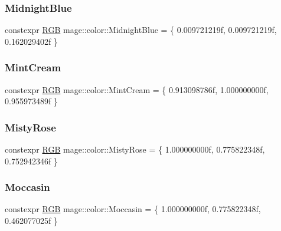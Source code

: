 \hypertarget{namespacemage_1_1color_a973485679cfd59ce6ca47a4f96104a62}{}\label{namespacemage_1_1color_a973485679cfd59ce6ca47a4f96104a62} 
\subsubsection{\texorpdfstring{Midnight\+Blue}{MidnightBlue}}
{\footnotesize\ttfamily constexpr \hyperlink{structmage_1_1_r_g_b}{R\+GB} mage\+::color\+::\+Midnight\+Blue = \{ 0.\+009721219f, 0.\+009721219f, 0.\+162029402f \}}

\hypertarget{namespacemage_1_1color_a545b07f3dbe9d887c33cd6575123d88d}{}\label{namespacemage_1_1color_a545b07f3dbe9d887c33cd6575123d88d} 
\subsubsection{\texorpdfstring{Mint\+Cream}{MintCream}}
{\footnotesize\ttfamily constexpr \hyperlink{structmage_1_1_r_g_b}{R\+GB} mage\+::color\+::\+Mint\+Cream = \{ 0.\+913098786f, 1.\+000000000f, 0.\+955973489f \}}

\hypertarget{namespacemage_1_1color_accc070278e15b17924142ac2cf2ffa7e}{}\label{namespacemage_1_1color_accc070278e15b17924142ac2cf2ffa7e} 
\subsubsection{\texorpdfstring{Misty\+Rose}{MistyRose}}
{\footnotesize\ttfamily constexpr \hyperlink{structmage_1_1_r_g_b}{R\+GB} mage\+::color\+::\+Misty\+Rose = \{ 1.\+000000000f, 0.\+775822348f, 0.\+752942346f \}}

\hypertarget{namespacemage_1_1color_ade191f43672b1ee280fbd53fed9d5558}{}\label{namespacemage_1_1color_ade191f43672b1ee280fbd53fed9d5558} 
\subsubsection{\texorpdfstring{Moccasin}{Moccasin}}
{\footnotesize\ttfamily constexpr \hyperlink{structmage_1_1_r_g_b}{R\+GB} mage\+::color\+::\+Moccasin = \{ 1.\+000000000f, 0.\+775822348f, 0.\+462077025f \}}

